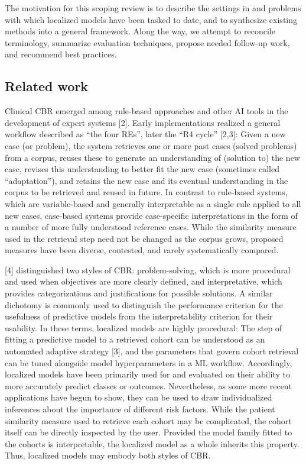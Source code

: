 \documentclass[preprint, 3p,
authoryear]{elsarticle} %
\begin{document}
The motivation for this scoping review is to describe the settings in
and problems with which localized models have been tasked to date, and
to synthesize existing methods into a general framework. Along the way,
we attempt to reconcile terminology, summarize evaluation techniques,
propose needed follow-up work, and recommend best practices.

\hypertarget{related-work}{%
\subsection{Related work}\label{related-work}}

Clinical CBR emerged among rule-based approaches and other AI tools in
the development of expert systems {[}2{]}. Early implementations
realized a general workflow described as ``the four REs'', later the
``R4 cycle'' {[}2,3{]}: Given a new case (or problem), the system
retrieves one or more past cases (solved problems) from a corpus, reuses
these to generate an understanding of (solution to) the new case,
revises this understanding to better fit the new case (sometimes called
``adaptation''), and retains the new case and its eventual understanding
in the corpus to be retrieved and reused in future. In contrast to
rule-based systems, which are variable-based and generally interpretable
as a single rule applied to all new cases, case-based systems provide
case-specific interpretations in the form of a number of more fully
understood reference cases. While the similarity measure used in the
retrieval step need not be changed as the corpus grows, proposed
measures have been diverse, contested, and rarely systematically
compared.

{[}4{]} distinguished two styles of CBR: problem-solving, which is more
procedural and used when objectives are more clearly defined, and
interpretative, which provides categorizations and justifications for
possible solutions. A similar dichotomy is commonly used to distinguish
the performance criterion for the usefulness of predictive models from
the interpretability criterion for their usability. In these terms,
localized models are highly procedural: The step of fitting a predictive
model to a retrieved cohort can be understood as an automated adaptive
strategy {[}3{]}, and the parameters that govern cohort retrieval can be
tuned alongside model hyperparameters in a ML workflow. Accordingly,
localized models have been primarily used for and evaluated on their
ability to more accurately predict classes or outcomes. Nevertheless, as
some more recent applications have begun to show, they can be used to
draw individualized inferences about the importance of different risk
factors. While the patient similarity measure used to retrieve each
cohort may be complicated, the cohort itself can be directly inspected
by the user. Provided the model family fitted to the cohorts is
interpretable, the localized model as a whole inherits this property.
Thus, localized models may embody both styles of CBR.
\end{document}
